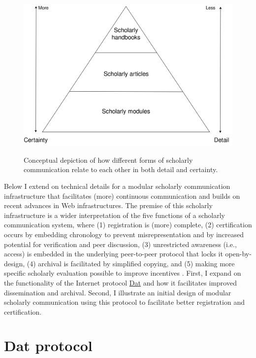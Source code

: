 \documentclass[publications,article,submit,moreauthors,pdftex,10pt,a4paper]{Definitions/mdpi}
\begin{document}
\begin{figure}
{\centering \includegraphics[width=1\linewidth]{fig1}}
\caption{Conceptual depiction of how different forms of scholarly communication relate to each other in both detail and certainty.}
\label{fig:datcom-fig1}
\end{figure}

Below I extend on technical details for a modular scholarly communication infrastructure that facilitates (more) continuous communication and builds on recent advances in Web infrastructures. The premise of this scholarly infrastructure is a wider interpretation of the five functions of a scholarly communication system, where (1) registration is (more) complete, (2) certification occurs by embedding chronology to prevent misrepresentation and by increased potential for verification and peer discussion, (3) unrestricted awareness (i.e., access) is embedded in the underlying peer-to-peer protocol that locks it open-by-design, (4) archival is facilitated by simplified copying, and (5) making more specific scholarly evaluation possible to improve incentives \citep[for an initial proposal of such evaluation systems see][]{doi:10.3390/publications6020021}. First, I expand on the functionality of the Internet protocol \href{https://datproject.org}{Dat} and how it facilitates improved dissemination and archival. Second, I illustrate an initial design of modular scholarly communication using this protocol to facilitate better registration and certification. 

\section*{Dat protocol}\label{dat-protocol}
\end{document}
